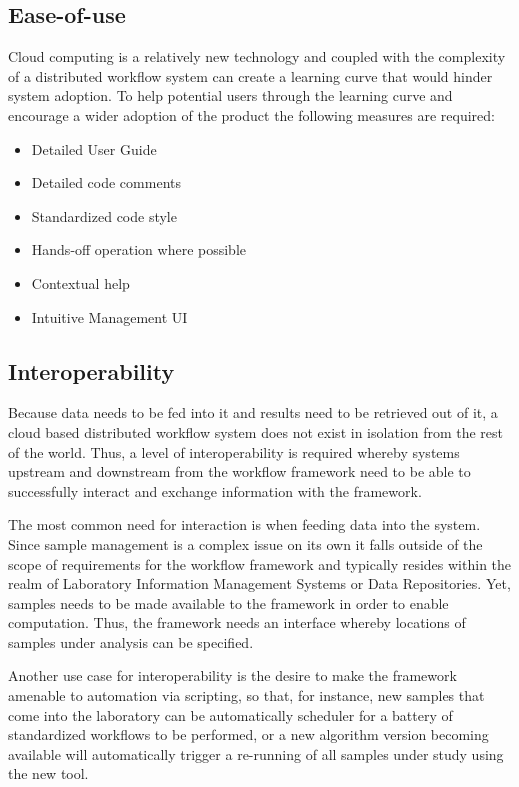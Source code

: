 \subsection {Ease-of-use} \label{sec:ease_of_use}

Cloud computing is a relatively new technology and coupled with the complexity of a distributed workflow system can create a learning curve that would hinder system adoption. To help potential users through the learning curve and encourage a wider adoption of the product the following measures are required:

\begin{itemize}
\item Detailed User Guide
\item Detailed code comments
\item Standardized code style
\item Hands-off operation where possible
\item Contextual help
\item Intuitive Management UI
\end{itemize}

\subsection {Interoperability} \label{sec:interoperability}

Because data needs to be fed into it and results need to be retrieved out of it, a cloud based distributed workflow system does not exist in isolation from the rest of the world. Thus, a level of interoperability is required whereby systems upstream and downstream from the workflow framework need to be able to successfully interact and exchange information with the framework.

The most common need for interaction is when feeding data into the system. Since sample management is a complex issue on its own it falls outside of the scope of requirements for the workflow framework and typically resides within the realm of Laboratory Information Management Systems or Data Repositories. Yet, samples needs to be made available to the framework in order to enable computation. Thus, the framework needs an interface whereby locations of samples under analysis can be specified.

Another use case for interoperability is the desire to make the framework amenable to automation via scripting, so that, for instance, new samples that come into the laboratory can be automatically scheduler for a battery of standardized workflows to be performed, or a new algorithm version becoming available will automatically trigger a re-running of all samples under study using the new tool.

